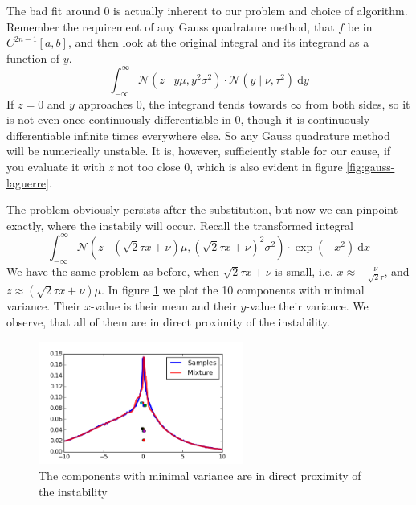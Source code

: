 \documentclass[11pt,a4paper]{book}
\begin{document}
The bad fit around $0$ is actually inherent to our problem and choice of
algorithm. Remember the requirement of any Gauss quadrature method, that $f$ be
in $C^{2n - 1}[a, b]$, and then look at the original integral and its integrand
as a function of $y$.
\begin{equation*}
  \int_{-\infty}^{\infty} \mathcal{N}\left( z \mid y\mu, y^{2}\sigma^{2} \right) \cdot \mathcal{N}(y \mid \nu, \tau^{2})~\mathrm{d}y
\end{equation*}
If $z = 0$ and $y$ approaches $0$, the integrand tends towards $\infty$ from
both sides, so it is not even once continuously differentiable in $0$, though it
is continuously differentiable infinite times everywhere else. So any Gauss
quadrature method will be numerically unstable. It is, however, sufficiently
stable for our cause, if you evaluate it with $z$ not too close $0$, which is
also evident in figure \ref{fig:gauss-laguerre}.

The problem obviously persists after the substitution, but now we can pinpoint
exactly, where the instabily will occur. Recall the transformed integral
\begin{equation*}
  \int_{-\infty}^{\infty} \mathcal{N}\left( z \mid \left(\sqrt{2}\tau x + \nu\right)\mu, \left(\sqrt{2}\tau x + \nu\right)^{2}\sigma^{2} \right) \cdot \exp\left( -x^{2} \right)~\mathrm{d}x
\end{equation*}
We have the same problem as before, when $\sqrt{2}\tau x + \nu$ is small,
i.e. $x \approx -\frac{\nu}{\sqrt{2}\tau}$, and
$z \approx \left(\sqrt{2}\tau x + \nu\right)\mu$. In figure
\ref{fig:gauss-hermite-instabilities} we plot the 10 components with minimal
variance. Their $x$-value is their mean and their $y$-value their variance. We
observe, that all of them are in direct proximity of the instability.
\begin{figure}[h]
  \centering
  \includegraphics[width=0.6\textwidth]{thesis/theory/gauss-hermite-instabilities}
  \caption{The components with minimal variance are in direct proximity of the
    instability}
  \label{fig:gauss-hermite-instabilities}
\end{figure}
\end{document}
